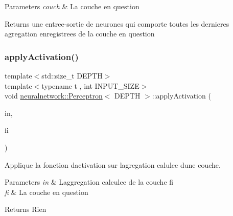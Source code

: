 \begin{DoxyParams}{Parameters}
{\em couch} & La couche en question \\
\hline
\end{DoxyParams}
\begin{DoxyReturn}{Returns}
une entree-\/sortie de neurones qui comporte toutes les dernieres agregation enregistrees de la couche en question 
\end{DoxyReturn}
\mbox{\label{classneuralnetwork_1_1_perceptron_ac65162cfaacf1d9e9493a0f71efe84f5}} 
\subsubsection{\texorpdfstring{apply\+Activation()}{applyActivation()}}
{\footnotesize\ttfamily template$<$std\+::size\+\_\+t D\+E\+P\+TH$>$ \\
template$<$typename t , int I\+N\+P\+U\+T\+\_\+\+S\+I\+ZE$>$ \\
void \mbox{\hyperlink{classneuralnetwork_1_1_perceptron}{neuralnetwork\+::\+Perceptron}}$<$ D\+E\+P\+TH $>$\+::apply\+Activation (\begin{DoxyParamCaption}\item[{\mbox{\hyperlink{_perceptron_8hpp_a1df3992453d71de615dab4ca5eadba8d}{neuralnetwork\+::\+In\+Out}}$<$ t, I\+N\+P\+U\+T\+\_\+\+S\+I\+ZE $>$ \&}]{in,  }\item[{std\+::size\+\_\+t}]{fi }\end{DoxyParamCaption})}



Applique la fonction d\textquotesingle{}activation sur l\textquotesingle{}agregation calulee d\textquotesingle{}une couche. 


\begin{DoxyParams}{Parameters}
{\em in} & L\textquotesingle{}aggregation calculee de la couche fi \\
\hline
{\em fi} & La couche en question \\
\hline
\end{DoxyParams}
\begin{DoxyReturn}{Returns}
Rien 
\end{DoxyReturn}

